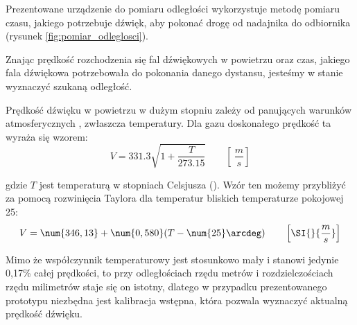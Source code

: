 Prezentowane urządzenie do pomiaru odległości wykorzystuje metodę pomiaru czasu, jakiego
potrzebuje dźwięk, aby pokonać drogę od nadajnika do odbiornika
(rysunek \ref{fig:pomiar_odleglosci}).

Znając prędkość rozchodzenia się fal dźwiękowych w powietrzu oraz czas, jakiego fala dźwiękowa potrzebowała
do pokonania danego dystansu, jesteśmy w stanie wyznaczyć szukaną odległość.

Prędkość dźwięku w powietrzu w dużym stopniu zależy od panujących warunków atmosferycznych \cite{bib:soundSpeed},
zwłaszcza temperatury.
Dla gazu doskonałego prędkość ta wyraża się wzorem:
\[
V = \num{331,3}  \sqrt{1+\frac{T}{\num{273,15}}} \qquad \left[ \SI{}{\frac{m}{s}} \right]
\]

gdzie $T$ jest temperaturą w stopniach Celsjusza (\SI{}{\degC}).
Wzór ten możemy przybliżyć za pomocą rozwinięcia Taylora dla temperatur bliskich temperaturze pokojowej \SI{25}{\degC}:
\[
 V = \num{346,13}  +  \num{0,580}(T - \num{25}\arcdeg)  \qquad \left[ \SI{}{ \frac{m}{s}} \right]
\]

Mimo że współczynnik temperaturowy jest stosunkowo mały i stanowi jedynie 0,17\% całej prędkości,
to przy odległościach rzędu metrów i rozdzielczościach rzędu milimetrów staje się on istotny, 
dlatego w przypadku prezentowanego prototypu niezbędna jest kalibracja wstępna, która pozwala
wyznaczyć aktualną prędkość dźwięku.





